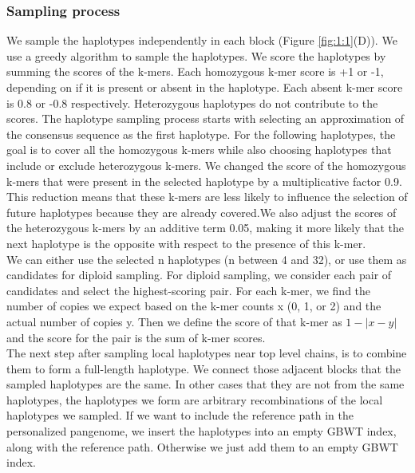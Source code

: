 \documentclass[11pt]{ucthesis}
\begin{document}
\subsubsection{Sampling process}
We sample the haplotypes independently in each block (Figure \ref{fig:1:1}(D)). We use a greedy algorithm to sample the haplotypes. We score the haplotypes by summing the scores of the k-mers. Each homozygous k-mer score is +1 or -1, depending on if it is present or absent in the haplotype. Each absent k-mer score is 0.8 or -0.8 respectively. Heterozygous haplotypes do not contribute to the scores. 
The haplotype sampling process starts with selecting an approximation of the consensus sequence as the first haplotype. For the following haplotypes, the goal is to cover all the homozygous k-mers while also choosing haplotypes that include or exclude heterozygous k-mers. We changed the score of the homozygous k-mers that were present in the selected haplotype by a multiplicative factor 0.9. This reduction means that these k-mers are less likely to influence the selection of future haplotypes because they are already covered.We also adjust the scores of the heterozygous k-mers by an additive term 0.05, making it more likely that the next haplotype is the opposite with respect to the presence of this k-mer. \\
We can either use the selected n haplotypes (n between 4 and 32), or use them as candidates for diploid sampling. For diploid sampling, we consider each pair of candidates and select the highest-scoring pair. For each k-mer, we find the number of copies we expect based on the k-mer counts x (0, 1, or 2) and the actual number of copies y. Then we define the score of that k-mer as $1 - |x-y|$ and the score for the pair is the sum of k-mer scores.\\
The next step after sampling local haplotypes near top level chains, is to combine them to form a full-length haplotype. We connect those adjacent blocks that the sampled haplotypes are the same. In other cases that they are not from the same haplotypes, the haplotypes we form are arbitrary recombinations of the local haplotypes we sampled.
If we want to include the reference path in the personalized pangenome, we insert the haplotypes into an empty GBWT index, along with the reference path. Otherwise we just add them to an empty GBWT index. 
\end{document}
